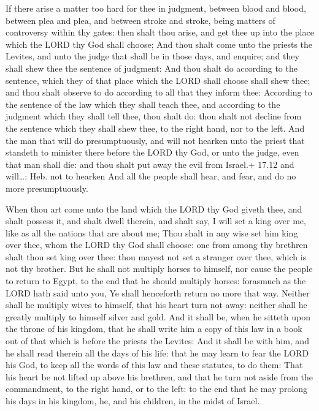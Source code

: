  If there arise a matter too hard for thee in judgment,
between blood and blood, between plea and plea, and between stroke and
stroke, being matters of controversy within thy gates: then shalt thou
arise, and get thee up into the place which the LORD thy God shall
choose;  And thou shalt come unto the priests the Levites,
and unto the judge that shall be in those days, and enquire; and they
shall shew thee the sentence of judgment:  And thou shalt
do according to the sentence, which they of that place which the LORD
shall choose shall shew thee; and thou shalt observe to do according to
all that they inform thee:  According to the sentence of
the law which they shall teach thee, and according to the judgment which
they shall tell thee, thou shalt do: thou shalt not decline from the
sentence which they shall shew thee, to the right hand, nor to the left.
 And the man that will do presumptuously, and will not
hearken unto the priest that standeth to minister there before the LORD
thy God, or unto the judge, even that man shall die: and thou shalt put
away the evil from Israel.+ 17.12 and will\ldots: Heb. not to hearken
 And all the people shall hear, and fear, and do no more
presumptuously.

 When thou art come unto the land which the LORD thy God
giveth thee, and shalt possess it, and shalt dwell therein, and shalt
say, I will set a king over me, like as all the nations that are about
me;  Thou shalt in any wise set him king over thee, whom
the LORD thy God shall choose: one from among thy brethren shalt thou
set king over thee: thou mayest not set a stranger over thee, which is
not thy brother.  But he shall not multiply horses to
himself, nor cause the people to return to Egypt, to the end that he
should multiply horses: forasmuch as the LORD hath said unto you, Ye
shall henceforth return no more that way.  Neither shall he
multiply wives to himself, that his heart turn not away: neither shall
he greatly multiply to himself silver and gold.  And it
shall be, when he sitteth upon the throne of his kingdom, that he shall
write him a copy of this law in a book out of that which is before the
priests the Levites:  And it shall be with him, and he
shall read therein all the days of his life: that he may learn to fear
the LORD his God, to keep all the words of this law and these statutes,
to do them:  That his heart be not lifted up above his
brethren, and that he turn not aside from the commandment, to the right
hand, or to the left: to the end that he may prolong his days in his
kingdom, he, and his children, in the midst of Israel.


